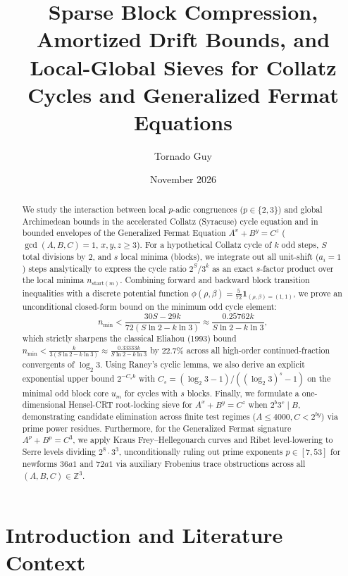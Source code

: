 \documentclass[11pt, a4paper]{amsart}
\title[Sparse Block Compression and Amortized Bounds for Collatz Cycles]{Sparse Block Compression, Amortized Drift Bounds, and Local-Global Sieves for Collatz Cycles and Generalized Fermat Equations}
\author{Tornado Guy}
\date{November 2026}
\theoremstyle{definition}
\begin{document}
\begin{abstract}
We study the interaction between local $p$-adic congruences ($p \in \{2, 3\}$) and global Archimedean bounds in the accelerated Collatz (Syracuse) cycle equation and in bounded envelopes of the Generalized Fermat Equation $A^x + B^y = C^z$ ($\gcd(A,B,C)=1$, $x,y,z \ge 3$). For a hypothetical Collatz cycle of $k$ odd steps, $S$ total divisions by $2$, and $s$ local minima (blocks), we integrate out all unit-shift ($a_i = 1$) steps analytically to express the cycle ratio $2^S / 3^k$ as an exact $s$-factor product over the local minima $n_{\text{start}(m)}$. Combining forward and backward block transition inequalities with a discrete potential function $\phi(\rho, \beta) = \frac{5}{72} \mathbf{1}_{(\rho,\beta)=(1,1)}$, we prove an unconditional closed-form bound on the minimum odd cycle element:
\[
n_{\min} < \frac{30 S - 29 k}{72 (S \ln 2 - k \ln 3)} \approx \frac{0.25762 k}{S \ln 2 - k \ln 3},
\]
which strictly sharpens the classical Eliahou (1993) bound $n_{\min} < \frac{k}{3(S \ln 2 - k \ln 3)} \approx \frac{0.33333 k}{S \ln 2 - k \ln 3}$ by $22.7\%$ across all high-order continued-fraction convergents of $\log_2 3$. Using Raney's cyclic lemma, we also derive an explicit exponential upper bound $2^{-C_s k}$ with $C_s = (\log_2 3 - 1)/((\log_2 3)^s - 1)$ on the minimal odd block core $u_m$ for cycles with $s$ blocks. Finally, we formulate a one-dimensional Hensel-CRT root-locking sieve for $A^x + B^y = C^z$ when $2^b 3^c \mid B$, demonstrating candidate elimination across finite test regimes ($A \le 4000, C < 2^{by}$) via prime power residues. Furthermore, for the Generalized Fermat signature $A^p + B^p = C^3$, we apply Kraus Frey--Hellegouarch curves and Ribet level-lowering to Serre levels dividing $2^8 \cdot 3^3$, unconditionally ruling out prime exponents $p \in [7, 53]$ for newforms $36a1$ and $72a1$ via auxiliary Frobenius trace obstructions across all $(A, B, C) \in \mathbb{Z}^3$.
\end{abstract}

\maketitle

\section{Introduction and Literature Context}
\end{document}
